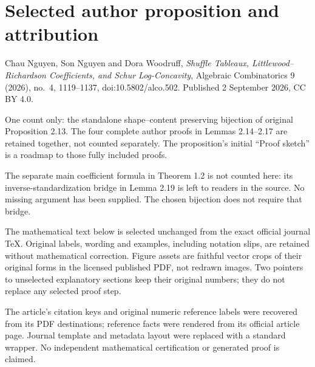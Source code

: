 \section*{Selected author proposition and attribution}
Chau Nguyen, Son Nguyen and Dora Woodruff, \emph{Shuffle Tableaux, Littlewood--Richardson Coefficients, and Schur Log-Concavity}, Algebraic Combinatorics 9 (2026), no.~4, 1119--1137, doi:10.5802/alco.502. Published 2 September 2026, CC BY 4.0.

One count only: the standalone shape--content preserving bijection of original Proposition 2.13. The four complete author proofs in Lemmas 2.14--2.17 are retained together, not counted separately. The proposition's initial ``Proof sketch'' is a roadmap to those fully included proofs.

The separate main coefficient formula in Theorem 1.2 is not counted here: its inverse-standardization bridge in Lemma 2.19 is left to readers in the source. No missing argument has been supplied. The chosen bijection does not require that bridge.

The mathematical text below is selected unchanged from the exact official journal TeX. Original labels, wording and examples, including notation slips, are retained without mathematical correction. Figure assets are faithful vector crops of their original forms in the licensed published PDF, not redrawn images. Two pointers to unselected explanatory sections keep their original numbers; they do not replace any selected proof step.

The article's citation keys and original numeric reference labels were recovered from its PDF destinations; reference facts were rendered from its official article page. Journal template and metadata layout were replaced with a standard wrapper. No independent mathematical certification or generated proof is claimed.
